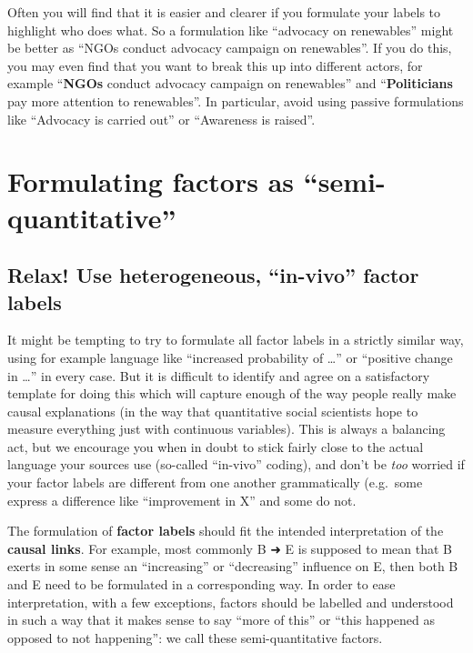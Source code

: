 \documentclass[
]{book}
\begin{document}
Often you will find that it is easier and clearer if you formulate your labels to highlight who does what. So a formulation like ``advocacy on renewables'' might be better as ``NGOs conduct advocacy campaign on renewables''. If you do this, you may even find that you want to break this up into different actors, for example ``\textbf{NGOs} conduct advocacy campaign on renewables'' and ``\textbf{Politicians} pay more attention to renewables''. In particular, avoid using passive formulations like ``Advocacy is carried out'' or ``Awareness is raised''.

\hypertarget{formulating-factors-as-semi-quantitative}{%
\section{Formulating factors as ``semi-quantitative''}\label{formulating-factors-as-semi-quantitative}}

\hypertarget{relax-use-heterogeneous-in-vivo-factor-labels}{%
\subsection{Relax! Use heterogeneous, ``in-vivo'' factor labels}\label{relax-use-heterogeneous-in-vivo-factor-labels}}

It might be tempting to try to formulate all factor labels in a strictly similar way, using for example language like ``increased probability of \ldots{}'' or ``positive change in \ldots{}'' in every case. But it is difficult to identify and agree on a satisfactory template for doing this which will capture enough of the way people really make causal explanations (in the way that quantitative social scientists hope to measure everything just with continuous variables). This is always a balancing act, but we encourage you when in doubt to stick fairly close to the actual language your sources use (so-called ``in-vivo'' coding), and don't be \emph{too} worried if your factor labels are different from one another grammatically (e.g.~some express a difference like ``improvement in X'' and some do not.

The formulation of \textbf{factor labels} should fit the intended interpretation of the \textbf{causal links}. For example, most commonly B ➜ E is supposed to mean that B exerts in some sense an ``increasing'' or ``decreasing'' influence on E, then both B and E need to be formulated in a corresponding way. In order to ease interpretation, with a few exceptions, factors should be labelled and understood in such a way that it makes sense to say ``more of this'' or ``this happened as opposed to not happening'': we call these semi-quantitative factors.
\end{document}
